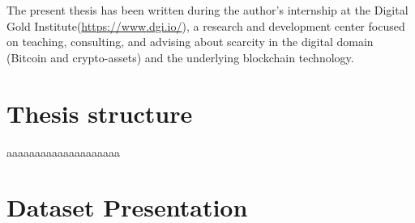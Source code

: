 \bigskip
\noindent
The present thesis has been written during the author's internship at the Digital Gold Institute(\href{https://www.dgi.io/}{https://www.dgi.io/}), a research and development center focused on teaching, consulting, and advising about scarcity in the digital domain (Bitcoin and crypto-assets) and the underlying blockchain technology.


\section{Thesis structure}
\bigskip
aaaaaaaaaaaaaaaaaaaa


\section{Dataset  Presentation}
\bigskip

